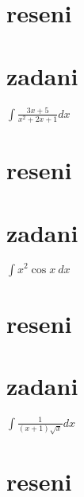 \documentclass[a4paper]{article}
\begin{document}
\section*{reseni}









\section*{zadani}
$\int \frac{3x+5}{x^2+2x+1} dx$

\section*{reseni}









\section*{zadani}
$\int x^2 \cos x~dx$

\section*{reseni}









\section*{zadani}
$\int \frac{1}{(x+1)\sqrt{x}} dx$

\section*{reseni}
\end{document}
